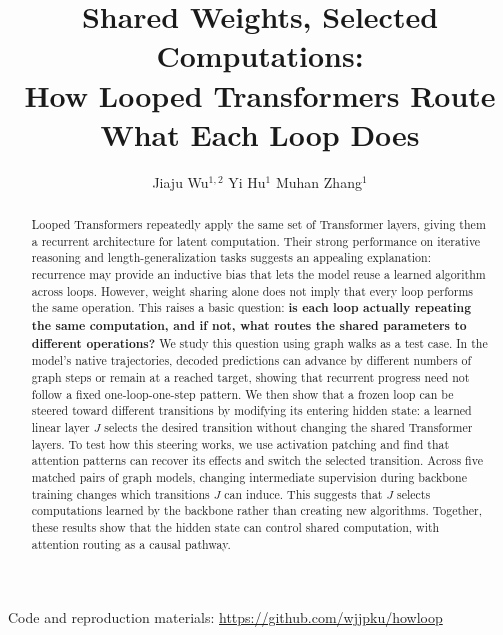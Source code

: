 \documentclass{article}
\title{Shared Weights, Selected Computations:\\How Looped Transformers Route\\What Each Loop Does}
\author{Jiaju Wu$^{1,2}$ \qquad Yi Hu$^1$ \qquad Muhan Zhang$^1$}
\begin{document}
\maketitle
\begingroup
\makeatletter
\let\@footnotetext\H@@footnotetext
\makeatother
\renewcommand{\thefootnote}{}
\endgroup
{}

\begin{abstract}
Looped Transformers repeatedly apply the same set of Transformer layers, giving them a recurrent architecture for latent computation. Their strong performance on iterative reasoning and length-generalization tasks suggests an appealing explanation: recurrence may provide an inductive bias that lets the model reuse a learned algorithm across loops. However, weight sharing alone does not imply that every loop performs the same operation. This raises a basic question: \textbf{is each loop actually repeating the same computation, and if not, what routes the shared parameters to different operations?}
We study this question using graph walks as a test case. In the model's native trajectories, decoded predictions can advance by different numbers of graph steps or remain at a reached target, showing that recurrent progress need not follow a fixed one-loop-one-step pattern. We then show that a frozen loop can be steered toward different transitions by modifying its entering hidden state: a learned linear layer $J$ selects the desired transition without changing the shared Transformer layers.
To test how this steering works, we use activation patching and find that attention patterns can recover its effects and switch the selected transition. Across five matched pairs of graph models, changing intermediate supervision during backbone training changes which transitions $J$ can induce. This suggests that $J$ selects computations learned by the backbone rather than creating new algorithms. Together, these results show that the hidden state can control shared computation, with attention routing as a causal pathway.
\end{abstract}

\begin{center}
\small Code and reproduction materials: \url{https://github.com/wjjpku/howloop}
\end{center}
\end{document}
